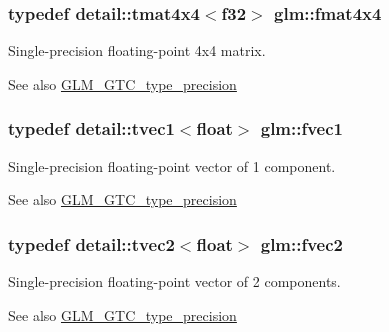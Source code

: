 \subsubsection[{fmat4x4}]{\setlength{\rightskip}{0pt plus 5cm}typedef detail\+::tmat4x4$<$f32$>$ {\bf glm\+::fmat4x4}}\label{group__gtc__type__precision_gad011717dba7e15802233b335618d8969}
Single-\/precision floating-\/point 4x4 matrix. \begin{DoxySeeAlso}{See also}
\hyperlink{group__gtc__type__precision}{G\+L\+M\+\_\+\+G\+T\+C\+\_\+type\+\_\+precision} 
\end{DoxySeeAlso}
\hypertarget{group__gtc__type__precision_ga432dcb1d24c21c1b9fead0739a4af218}{}
\subsubsection[{fvec1}]{\setlength{\rightskip}{0pt plus 5cm}typedef detail\+::tvec1$<$float$>$ {\bf glm\+::fvec1}}\label{group__gtc__type__precision_ga432dcb1d24c21c1b9fead0739a4af218}
Single-\/precision floating-\/point vector of 1 component. \begin{DoxySeeAlso}{See also}
\hyperlink{group__gtc__type__precision}{G\+L\+M\+\_\+\+G\+T\+C\+\_\+type\+\_\+precision} 
\end{DoxySeeAlso}
\hypertarget{group__gtc__type__precision_ga68722f27c558737659b1bd1eac4d1686}{}
\subsubsection[{fvec2}]{\setlength{\rightskip}{0pt plus 5cm}typedef detail\+::tvec2$<$float$>$ {\bf glm\+::fvec2}}\label{group__gtc__type__precision_ga68722f27c558737659b1bd1eac4d1686}
Single-\/precision floating-\/point vector of 2 components. \begin{DoxySeeAlso}{See also}
\hyperlink{group__gtc__type__precision}{G\+L\+M\+\_\+\+G\+T\+C\+\_\+type\+\_\+precision} 
\end{DoxySeeAlso}
\hypertarget{group__gtc__type__precision_gaa3a8ce13ad981d1e1791070f52a885c7}{}
